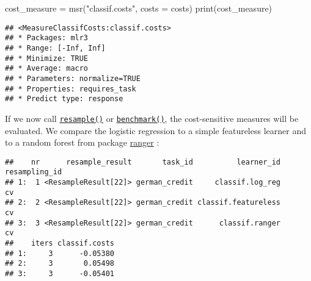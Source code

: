 \documentclass[
]{scrbook}
\newenvironment{Shaded}{\begin{snugshade}}{\end{snugshade}}
\newcommand{\AttributeTok}[1]{\textcolor[rgb]{0.77,0.63,0.00}{#1}}
\newcommand{\DecValTok}[1]{\textcolor[rgb]{0.00,0.00,0.81}{#1}}
\newcommand{\FunctionTok}[1]{\textcolor[rgb]{0.00,0.00,0.00}{#1}}
\newcommand{\NormalTok}[1]{#1}
\newcommand{\OtherTok}[1]{\textcolor[rgb]{0.56,0.35,0.01}{#1}}
\newcommand{\SpecialCharTok}[1]{\textcolor[rgb]{0.00,0.00,0.00}{#1}}
\newcommand{\StringTok}[1]{\textcolor[rgb]{0.31,0.60,0.02}{#1}}
\renewenvironment{Shaded} {\begin{snugshade}\small} {\end{snugshade}}
\begin{document}
\begin{Shaded}
\begin{Highlighting}[]
\NormalTok{cost\_measure }\OtherTok{=} \FunctionTok{msr}\NormalTok{(}\StringTok{"classif.costs"}\NormalTok{, }\AttributeTok{costs =}\NormalTok{ costs)}
\FunctionTok{print}\NormalTok{(cost\_measure)}
\end{Highlighting}
\end{Shaded}

\begin{verbatim}
## <MeasureClassifCosts:classif.costs>
## * Packages: mlr3
## * Range: [-Inf, Inf]
## * Minimize: TRUE
## * Average: macro
## * Parameters: normalize=TRUE
## * Properties: requires_task
## * Predict type: response
\end{verbatim}

If we now call \href{https://mlr3.mlr-org.com/reference/resample.html}{\texttt{resample()}} or \href{https://mlr3.mlr-org.com/reference/benchmark.html}{\texttt{benchmark()}}, the cost-sensitive measures will be evaluated.
We compare the logistic regression to a simple featureless learner and to a random forest from package \href{https://cran.r-project.org/package=ranger}{ranger} :

\begin{Shaded}
\end{Shaded}

\begin{verbatim}
##    nr      resample_result       task_id          learner_id resampling_id
## 1:  1 <ResampleResult[22]> german_credit     classif.log_reg            cv
## 2:  2 <ResampleResult[22]> german_credit classif.featureless            cv
## 3:  3 <ResampleResult[22]> german_credit      classif.ranger            cv
##    iters classif.costs
## 1:     3      -0.05380
## 2:     3       0.05498
## 3:     3      -0.05401
\end{verbatim}
\end{document}
